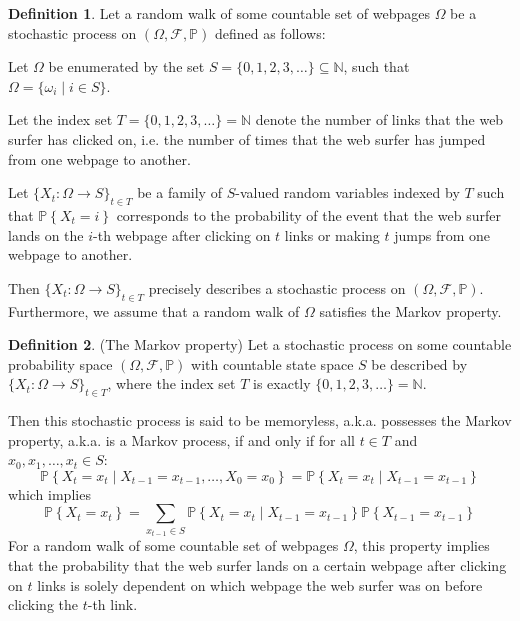 \documentclass[11pt]{article}
\theoremstyle{definition}
\newtheorem{definition}{Definition}
\newcommand{\N}{\mathbb{N}}
\newcommand{\p}[1]{\mathbb{P}\left\{#1\right\}}
\begin{document}
\begin{definition}
    Let a random walk of some countable set of webpages $\Omega$ be a stochastic process on $(\Omega, \mathcal{F}, \mathbb{P})$ defined as follows:

    Let $\Omega$ be enumerated by the set $S = \{0, 1, 2, 3, \ldots\} \subseteq \N$, such that $\Omega = \{\omega_i \mid i \in S\}$.

    Let the index set $T = \{0, 1, 2, 3, \ldots \} = \N$ denote the number of links that the web surfer has clicked on, i.e. the number of times that the web surfer has jumped from one webpage to another.
    
    Let $\{X_t : \Omega \to S\}_{t \in T}$ be a family of $S$-valued random variables indexed by $T$ such that
    $\p{X_t = i}$ corresponds to the probability of the event that the web surfer lands on the $i$-th webpage after clicking on $t$ links or making $t$ jumps from one webpage to another.

    Then $\{X_t : \Omega \to S\}_{t \in T}$ precisely describes a stochastic process on $(\Omega, \mathcal{F}, \mathbb{P})$.
    Furthermore, we assume that a random walk of $\Omega$ satisfies the Markov property.
\end{definition}

\begin{definition}
    (The Markov property) Let a stochastic process on some countable probability space $(\Omega, \mathcal{F}, \mathbb{P})$
    with countable state space $S$ be described by $\{X_t : \Omega \to S\}_{t \in T}$,
    where the index set $T$ is exactly $\{0, 1, 2, 3, \ldots \} = \N$.
    
    Then this stochastic process is said to be memoryless, a.k.a. possesses the Markov property, a.k.a. is a Markov process, if and only if for all $t \in T$ and $x_0, x_1, \ldots, x_t \in S$:
    $$\p{X_t = x_t \mid X_{t-1} = x_{t-1}, \ldots, X_0 = x_0} = \p{X_t = x_t \mid X_{t-1} = x_{t-1}}$$
    which implies
    $$\p{X_t = x_t} = \sum_{x_{t-1} \in S} \p{X_t = x_t \mid X_{t-1} = x_{t-1}} \p{X_{t-1} = x_{t-1}}$$
    For a random walk of some countable set of webpages $\Omega$, this property implies that 
    the probability that the web surfer lands on a certain webpage after clicking on $t$ links is solely dependent on
    which webpage the web surfer was on before clicking the $t$-th link.
\end{definition}
\end{document}
